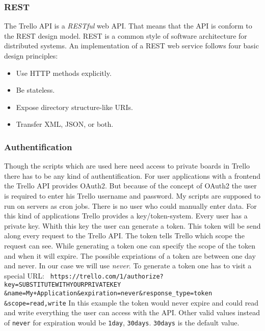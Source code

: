 \subsubsection{REST}
The Trello API is a \emph{RESTful} web API. That means that the API is conform to the REST design model. REST is a common style of software architecture for distributed systems. An implementation of a REST web service follows four basic design principles:
\begin{itemize}
	\item Use HTTP methods explicitly.
	\item Be stateless.
	\item Expose directory structure-like URIs.
	\item Transfer XML, JSON, or both.
\end{itemize}

\cite{rest}

\subsubsection{Authentification}
Though the scripts which are used here need access to private boards in Trello there has to be any kind of authentification. For user applications with a frontend the Trello API provides OAuth2. But because of the concept of OAuth2 the user is required to enter his Trello username and password. \cite{oauth} My scripts are supposed to run on servers as cron jobs. There is no user who could manually enter data. For this kind of applications Trello provides a key/token-system. Every user has a private key. Whith this key the user can generate a token. This token will be send along every request to the Trello API. The token tells Trello which scope the request can see. While generating a token one can specify the scope of the token and when it will expire. The possible expriations of a token are between one day and never. In our case we will use \emph{never}. To generate a token one has to visit a special URL:
\texttt{
https://trello.com/1/authorize?key=SUBSTITUTEWITHYOURPRIVATEKEY \&name=My+Application\&expiration=never\&response\_type=token \&scope=read,write}
In this example the token would never expire and could read and write everything the user can access with the API. Other valid values instead of \texttt{never} for expiration would be \texttt{1day}, \texttt{30days}. \texttt{30days} is the default value.

